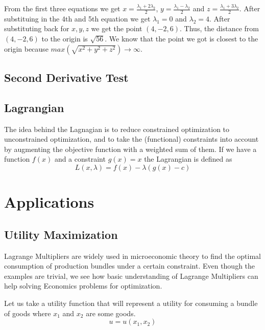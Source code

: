 \documentclass[]{article}
\begin{document}
From the first three equations we get $x=\frac{\lambda_1 + 2\lambda_2}{2}$, $y=\frac{\lambda_1 - \lambda_2}{2}$ and $z=\frac{\lambda_1 + 3\lambda_2}{2}$.
After substituing in the 4th and 5th equation we get $\lambda_1=0$ and $\lambda_2=4$. After substituting back for $x,y,z$ we get the point $(4,-2,6)$. 
Thus, the distance from $(4,-2,6)$ to the origin is $\sqrt{56}$. We know that the point we got is closest to the origin because $max(\sqrt{x^2+y^2+z^2}) \to \infty$.



\subsection{Second Derivative Test}

\subsection{Lagrangian}

The idea behind the Lagnagian is to reduce constrained optimization to unconstrained optimization, and to take the (functional) constraints into
account by augmenting the objective function with a weighted sum of them. If we have a function $f(x)$ and a constraint $g(x) = x$ the Lagrangian is defined as 
$$
    L(x,\lambda) = f(x) - \lambda(g(x) - c)
$$

\section{Applications}

\subsection{Utility Maximization}

Lagrange Multipliers are widely used in microeconomic theory to find the optimal consumption of production bundles under a certain constraint. Even though the examples are trivial, we see how basic understanding of Lagrange Multipliers can help solving Economics problems for optimization.

Let us take a utility function that will represent a utility for consuming a bundle of goods where $x_1$ and $x_2$ are some goods.$$u=u(x_1,x_2)$$ 
\end{document}
